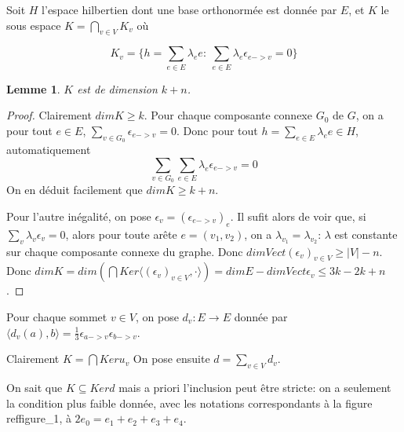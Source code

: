\documentclass[10pt]{article}
\newtheorem{lemma}{Lemme}[section]
\begin{document}
Soit $H$ l'espace hilbertien dont une base orthonormée est donnée par $E$, et $K$ le sous espace $K=\bigcap_{v\in V} K_v$  où

\[K_v=\{ h=\sum_{e \in E} \lambda_e e : \ \sum_{e \in E} \lambda_e \epsilon_{e->v}=0\}\]

\begin{lemma}
$K$ est de dimension $k+n$.
\end{lemma}
\begin{proof}
Clairement $dim K\geq k$. Pour chaque composante connexe $G_0$ de $G$, on a pour tout $e\in E$, $\sum_{v \in G_0} \epsilon_{e->v}=0$. Donc pour tout $h=\sum_{e \in E} \lambda_e e \in H$, automatiquement  \[\sum_{v \in G_0} \sum_{e \in E} \lambda_e \epsilon_{e->v}=0\]
 On en déduit facilement que $dim K\geq k+n$.



Pour l'autre inégalité, on pose $\epsilon_v=(\epsilon_{e->v})_e$. Il sufit alors de voir que, si $\sum_v \lambda_v \epsilon_v=0$, alors pour toute arête $e=(v_1,v_2)$, on a $\lambda_{v_1}=\lambda_{v_2}$: $\lambda$ est constante sur chaque composante connexe du graphe. Donc $dim Vect (\epsilon_v )_{v \in V} \geq |V|-n$. Donc $dim K= dim \left(
\bigcap Ker \langle (\epsilon_v )_{v \in V}, \cdot \rangle \right)= dim E - dim Vect \epsilon_v\leq 3k- 2k+n$.

\end{proof}



Pour chaque sommet $v\in V$, on pose $d_v:E\to E$ donnée par $\langle d_v(a),b\rangle =\frac{1}{3}\epsilon_{a->v}\epsilon_{b->v}$. %

Clairement $K= \bigcap Ker u_v$
On pose ensuite $d=\sum_{v\in V} d_v$. %

On sait que $K \subseteq Ker d$ mais a priori l'inclusion peut être stricte: on a seulement la condition plus faible donnée, avec les notations correspondants à la figure ref{figure_1}, à $2e_0=e_1+e_2+e_3+e_4$.
\end{document}

